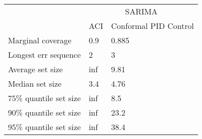 \begin{tabular}{lll}
\toprule
& \multicolumn{2}{c}{SARIMA} \\
& ACI & Conformal PID Control \\
\midrule
Marginal coverage & 0.9 & 0.885 \\
Longest err sequence & 2 & 3 \\
Average set size & inf & 9.81 \\
Median set size & 3.4 & 4.76 \\
75\% quantile set size & inf & 8.5 \\
90\% quantile set size & inf & 23.2 \\
95\% quantile set size & inf & 38.4 \\
\bottomrule
\end{tabular}
